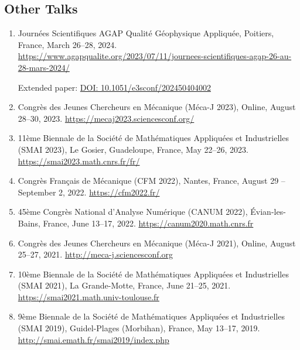 \documentclass[10pt]{article} %
\begin{document}
\subsection{Other Talks}

\begin{enumerate}
  \item Journées Scientifiques AGAP Qualité Géophysique Appliquée,  
  Poitiers, France, March 26–28, 2024.  
\href{https://www.agapqualite.org/2023/07/11/journees-scientifiques-agap-26-au-28-mars-2024/}{\url{https://www.agapqualite.org/2023/07/11/journees-scientifiques-agap-26-au-28-mars-2024/}}
 
  Extended paper: \href{https://doi.org/10.1051/e3sconf/202450404002}{DOI: 10.1051/e3sconf/202450404002}

  \item Congrès des Jeunes Chercheurs en Mécanique (Méca-J 2023),  
  Online, August 28–30, 2023.  
  \href{https://mecaj2023.sciencesconf.org/}{https://mecaj2023.sciencesconf.org/}

  \item 11ème Biennale de la Société de Mathématiques Appliquées et Industrielles (SMAI 2023),  
  Le Gosier, Guadeloupe, France, May 22–26, 2023.  
  \href{https://smai2023.math.cnrs.fr/fr/}{https://smai2023.math.cnrs.fr/fr/}

  \item Congrès Français de Mécanique (CFM 2022),  
  Nantes, France, August 29 – September 2, 2022.  
  \href{https://cfm2022.fr/}{https://cfm2022.fr/}

  \item 45ème Congrès National d'Analyse Numérique (CANUM 2022),  
  Évian-les-Bains, France, June 13–17, 2022.  
  \href{https://canum2020.math.cnrs.fr}{https://canum2020.math.cnrs.fr}

  \item Congrès des Jeunes Chercheurs en Mécanique (Méca-J 2021),  
  Online, August 25–27, 2021.  
  \href{http://meca-j.sciencesconf.org}{http://meca-j.sciencesconf.org}

  \item 10ème Biennale de la Société de Mathématiques Appliquées et Industrielles (SMAI 2021),  
  La Grande-Motte, France, June 21–25, 2021.  
  \href{https://smai2021.math.univ-toulouse.fr}{https://smai2021.math.univ-toulouse.fr}

  \item 9ème Biennale de la Société de Mathématiques Appliquées et Industrielles (SMAI 2019),  
  Guidel-Plages (Morbihan), France, May 13–17, 2019.  
  \href{http://smai.emath.fr/smai2019/index.php}{http://smai.emath.fr/smai2019/index.php}
\end{enumerate}
\end{document}
